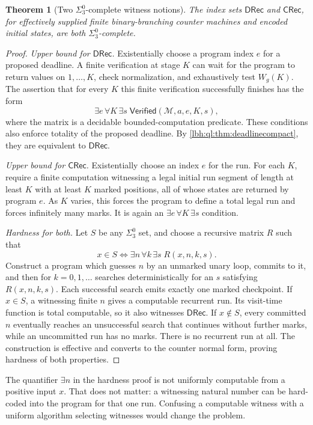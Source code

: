 \documentclass[11pt,letterpaper]{article}
\newtheorem{theorem}{Theorem}[section]
\theoremstyle{definition}
\theoremstyle{remark}
\newcommand{\CRec}{\mathsf{CRec}}
\newcommand{\DRec}{\mathsf{DRec}}
\newcommand{\1}{\mathbf 1}
\newcommand{\M}{\mathcal M}
\begin{document}
\begin{theorem}[Two $\Sigma^0_3$-complete witness notions]
\label{lbh:ql:thm:sigma3}
The index sets $\DRec$ and $\CRec$, for effectively supplied finite
binary-branching counter machines and encoded initial states, are both
$\Sigma^0_3$-complete.
\end{theorem}
\begin{proof}
\emph{Upper bound for $\DRec$.} Existentially choose a program index $e$ for
a proposed deadline. A finite verification at stage $K$ can wait for the
program to return values on $1,\ldots,K$, check normalization, and exhaustively
test $W_g(K)$. The assertion that for every $K$ this finite verification
successfully finishes has the form
\[
 \exists e\,\forall K\,\exists s\;
 \mathsf{Verified}(\M,a,e,K,s),
\]
where the matrix is a decidable bounded-computation predicate. These conditions
also enforce totality of the proposed deadline. By
\cref{lbh:ql:thm:deadlinecompact}, they are equivalent to $\DRec$.

\emph{Upper bound for $\CRec$.} Existentially choose an index $e$ for the run.
For each $K$, require a finite computation witnessing a legal initial run
segment of length at least $K$ with at least $K$ marked positions, all of whose
states are returned by program $e$. As $K$ varies, this forces the program
to define a total legal run and forces infinitely many marks. It is again
an $\exists e\,\forall K\,\exists s$ condition.

\emph{Hardness for both.} Let $S$ be any $\Sigma^0_3$ set, and choose a
recursive matrix $R$ such that
\[
 x\in S\iff\exists n\,\forall k\,\exists s\;R(x,n,k,s).
\]
Construct a program which guesses $n$ by an unmarked unary loop, commits to
it, and then for $k=0,1,\ldots$ searches deterministically for an $s$ satisfying
$R(x,n,k,s)$. Each successful search emits exactly one marked checkpoint.
If $x\in S$, a witnessing finite $n$ gives a computable recurrent run.
Its visit-time function is total computable, so it also witnesses $\DRec$.
If $x\notin S$, every committed $n$ eventually reaches an unsuccessful search
that continues without further marks, while an uncommitted run has no marks.
There is no recurrent run at all. The construction is effective and converts
to the counter normal form, proving hardness of both properties.
\end{proof}
The quantifier $\exists n$ in the hardness proof is not uniformly computable
from a positive input $x$. That does not matter: a witnessing natural number
can be hard-coded into the program for that one run. Confusing a computable
witness with a uniform algorithm selecting witnesses would change the problem.
\end{document}
